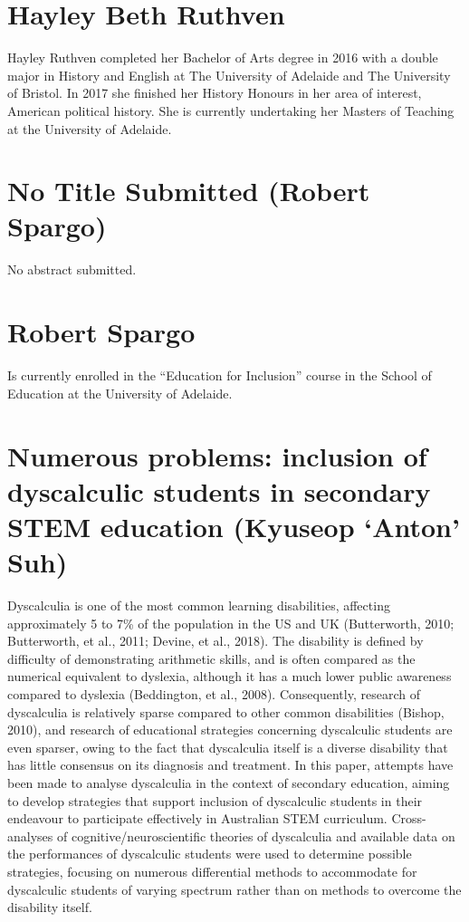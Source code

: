 \documentclass[twoside,14pt,a4paper,notitlepage]{memoir}
\begin{document}
\section*{Hayley Beth Ruthven}

Hayley Ruthven completed her Bachelor of Arts degree in 2016 with a double major in History and English at The University of Adelaide and The University of Bristol. In 2017 she finished her History Honours in her area of interest, American political history. She is currently undertaking her Masters of Teaching at the University of Adelaide.



\section*{No Title Submitted (Robert Spargo)}
\label{aut:spargo}

No abstract submitted.

\section*{Robert Spargo}

Is currently enrolled in the ``Education for Inclusion'' course in the School of Education at the University of Adelaide.



\section*{Numerous problems: inclusion of dyscalculic students in secondary STEM education (Kyuseop `Anton' Suh)}
\label{aut:suh}

Dyscalculia is one of the most common learning disabilities, affecting approximately 5 to 7\% of the population in the US and UK (Butterworth, 2010; Butterworth, et al., 2011; Devine, et al., 2018). The disability is defined by difficulty of demonstrating arithmetic skills, and is often compared as the numerical equivalent to dyslexia, although it has a much lower public awareness compared to dyslexia (Beddington, et al., 2008). Consequently, research of dyscalculia is relatively sparse compared to other common disabilities (Bishop, 2010), and research of educational strategies concerning dyscalculic students are even sparser, owing to the fact that dyscalculia itself is a diverse disability that has little consensus on its diagnosis and treatment. In this paper, attempts have been made to analyse dyscalculia in the context of secondary education, aiming to develop strategies that support inclusion of dyscalculic students in their endeavour to participate effectively in Australian STEM curriculum. Cross-analyses of cognitive/neuroscientific theories of dyscalculia and available data on the performances of dyscalculic students were used to determine possible strategies, focusing on numerous differential methods to accommodate for dyscalculic students of varying spectrum rather than on methods to overcome the disability itself.
\end{document}
